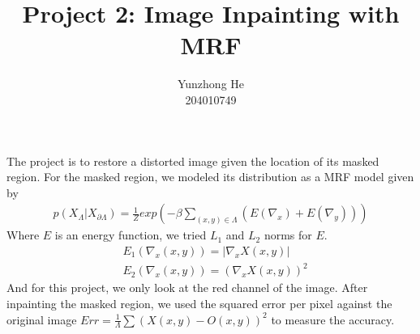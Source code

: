 \documentclass[12pt]{article}
\newenvironment{problem}[2][Part]{\begin{trivlist}
\item[\hskip \labelsep {\bfseries #1}\hskip \labelsep {\bfseries #2}]}{\end{trivlist}}
\begin{document}
 
 
\title{Project 2: Image Inpainting with MRF}%
\author{Yunzhong He\\ %
204010749} %
 
\maketitle

\begin{problem}{I Introduction}
\item{}
The project is to restore a distorted image given the location of its masked region. For the masked region, we modeled its distribution as a MRF model given by 
\begin{align*}
	p(X_\Lambda|X_{\partial\Lambda}) = \frac{1}{Z}exp(-\beta\sum_{(x,y)\in\Lambda} (E(\nabla_x) + E(\nabla_y)))
\end{align*}
Where $E$ is an energy function, we tried $L_1$ and $L_2$ norms for $E$.
\begin{align*}
	&E_1(\nabla_x(x, y)) = |\nabla_xX(x,y)|\\
	&E_2(\nabla_x(x, y)) = (\nabla_xX(x,y))^2
\end{align*}
And for this project, we only look at the red channel of the image. After inpainting the masked region, we used the squared error per pixel against the original image $Err = \frac{1}{\Lambda} \sum (X(x,y) - O(x,y))^2$ to measure the accuracy.
\end{problem}
\end{document}
